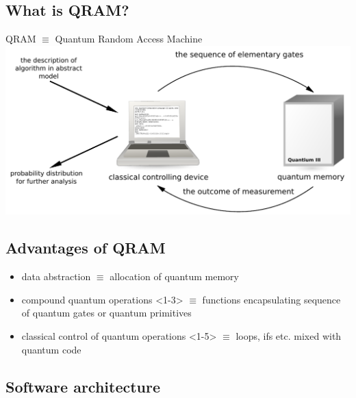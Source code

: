 \documentclass[a4paper,11pt]{article}
\begin{document}
\subsection{What is QRAM?}

\begin{center}
QRAM $\equiv$ Quantum Random Access Machine\\[12pt]
\includegraphics[width=\textwidth]{../slides/pics/qram}
\end{center}


\subsection{Advantages of QRAM}

\begin{itemize}
\item data abstraction {$\equiv$ allocation of quantum memory}
\item compound quantum operations <1-3>{\phantom{$\equiv$ 
    functions encapsulating sequence of quantum gates or quantum primitives}}%
{$\equiv$ functions encapsulating sequence of quantum gates or 
quantum primitives}
\item classical control of quantum operations
<1-5>{\phantom{$\equiv$ loops, ifs etc. mixed with quantum code}}%
{$\equiv$ loops, ifs etc. mixed with quantum code}
\end{itemize}



\subsection{Software architecture}
\end{document}
